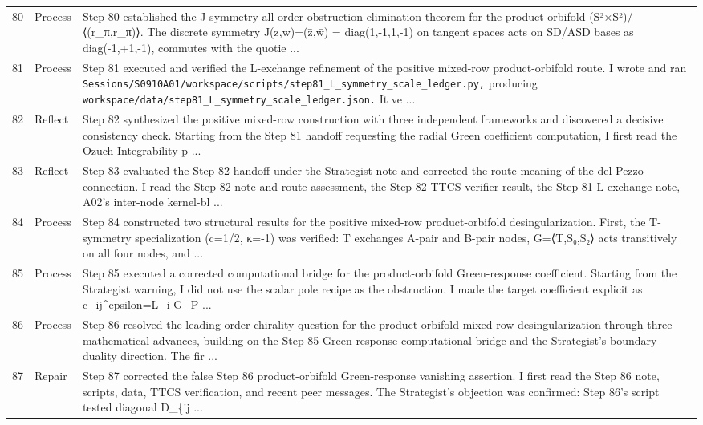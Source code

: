 \documentclass[UTF8,fontset=fandol,zihao=-4]{ctexart}
\begin{document}
\begin{longtable}{r p{} >{\raggedright\arraybackslash}p{}}
80 & Process & Step 80 established the J-symmetry all-order obstruction elimination theorem for the product orbifold (S²×S²)/⟨(r\_π,r\_π)⟩. The discrete symmetry J(z,w)=(z̄,w̄) = diag(1,-1,1,-1) on tangent spaces acts on SD/ASD bases as diag(-1,+1,-1), commutes with the quotie ...\\
81 & Process & Step 81 executed and verified the L-exchange refinement of the positive mixed-row product-orbifold route. I wrote and ran \nolinkurl{Sessions/S0910A01/workspace/scripts/step81_L_symmetry_scale_ledger.py,} producing \nolinkurl{workspace/data/step81_L_symmetry_scale_ledger.json.} It ve ...\\
82 & Reflect & Step 82 synthesized the positive mixed-row construction with three independent frameworks and discovered a decisive consistency check. Starting from the Step 81 handoff requesting the radial Green coefficient computation, I first read the Ozuch Integrability p ...\\
83 & Reflect & Step 83 evaluated the Step 82 handoff under the Strategist note and corrected the route meaning of the del Pezzo connection. I read the Step 82 note and route assessment, the Step 82 TTCS verifier result, the Step 81 L-exchange note, A02’s inter-node kernel-bl ...\\
84 & Process & Step 84 constructed two structural results for the positive mixed-row product-orbifold desingularization. First, the T-symmetry specialization (c=1/2, κ=-1) was verified: T exchanges A-pair and B-pair nodes, G=⟨T,S₀,S₂⟩ acts transitively on all four nodes, and ...\\
85 & Process & Step 85 executed a corrected computational bridge for the product-orbifold Green-response coefficient. Starting from the Strategist warning, I did not use the scalar pole recipe as the obstruction. I made the target coefficient explicit as c\_ij\textasciicircum{}epsilon=L\_i G\_P ...\\
86 & Process & Step 86 resolved the leading-order chirality question for the product-orbifold mixed-row desingularization through three mathematical advances, building on the Step 85 Green-response computational bridge and the Strategist's boundary-duality direction. The fir ...\\
87 & Repair & Step 87 corrected the false Step 86 product-orbifold Green-response vanishing assertion. I first read the Step 86 note, scripts, data, TTCS verification, and recent peer messages. The Strategist's objection was confirmed: Step 86's script tested diagonal D\_\{ij ...\\

\end{longtable}
\end{document}
